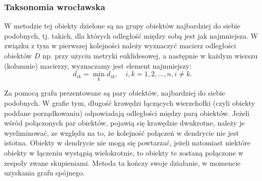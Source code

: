 \documentclass[12pt,a4paper]{report}
\begin{document}
\subsubsection{Taksonomia wrocławska}


W metodzie tej obiekty dzielone są na grupy obiektów najbardziej do siebie podobnych, tj. takich, dla których odległość między sobą jest jak najmniejsza. W związku z tym w pierwszej kolejności należy wyznaczyć macierz odległości obiektów $D$ np. przy użyciu metryki euklidesowej, a następnie w każdym wierszu (kolumnie) macierzy, wyznaczamy jest element najmniejszy: 
$$
d_{ik}= \min\limits_{k} {d_{ik}}, \quad i,k=1,2,\dots,n, i\neq k.
$$

Za pomocą grafu prezentowane są pary obiektów, najbardziej do siebie podobnych. W grafie tym, długość krawędzi łączących wierzchołki (czyli obiekty poddane porządkowaniu) odpowiadają odległości między parą obiektów. Jeżeli wśród połączonych par obiektów, pojawią się krawędzie dwukrotne, należy je wyeliminować, ze względu na to, że kolejność połączeń w dendrycie nie jest istotna. Obiekty w dendrycie nie mogą się powtarzać, jeżeli natomiast niektóre obiekty w łączeniu wystąpią wielokrotnie, to obiekty te zostaną połączone w zespoły zwane skupieniami. Metoda ta kończy swoje działanie, w momencie uzyskania grafu spójnego. 
\end{document}
